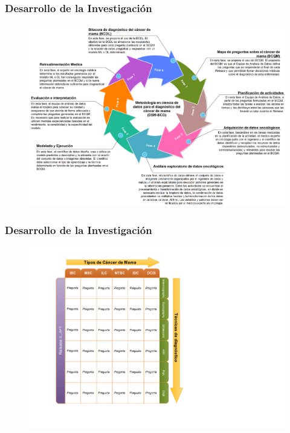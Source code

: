 \documentclass[xcolor=dvipsnames,xcolor=table]{beamer} %
\begin{document}
\begin{frame}
	\frametitle{Desarrollo de la Investigación}
	\begin{figure}[h!]
		\centering
		\includegraphics[width=0.87\linewidth]{PROYECTO/imgs/DSM-BCD_SPANISH}
	\end{figure}
\end{frame}

\begin{frame}
	\frametitle{Desarrollo de la Investigación}
	\begin{figure}[h!]
		\centering
		\includegraphics[width=0.56\linewidth]{PROYECTO/imgs/BCQM_SPANISH}
	\end{figure}
\end{frame}	
\end{document}
